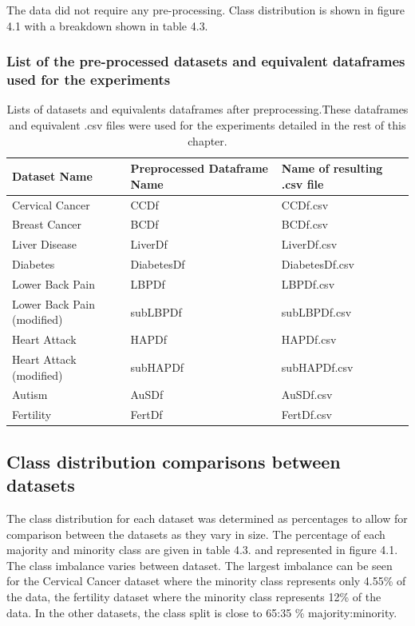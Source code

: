 The data did not require any pre-processing. Class distribution is shown in figure 4.1 with a breakdown shown in table 4.3.\newline


\subsubsection{List of the pre-processed datasets and equivalent dataframes used for the experiments}

\begin{table}[!htbp]
\centering
\begin{tabular}{p{3cm}p{3.5cm}p{3cm}}
  \hline
  \rowcolor{LightCyan}
Dataset Name & Preprocessed Dataframe Name & Name of resulting .csv file\\ 
  \hline
   Cervical Cancer & CCDf & CCDf.csv \\ 
   Breast Cancer & BCDf & BCDf.csv \\ 
   Liver Disease & LiverDf & LiverDf.csv \\ 
   Diabetes & DiabetesDf & DiabetesDf.csv \\ 
   Lower Back Pain & LBPDf &  LBPDf.csv\\ 
   Lower Back Pain (modified) & subLBPDf & subLBPDf.csv \\ 
   Heart Attack & HAPDf & HAPDf.csv \\ 
   Heart Attack (modified) & subHAPDf & subHAPDf.csv \\ 
   Autism & AuSDf & AuSDf.csv \\ 
   Fertility & FertDf & FertDf.csv \\ 
   \hline
\end{tabular}
\caption{Lists of datasets and equivalents dataframes after preprocessing.These dataframes and equivalent .csv files were used for the experiments detailed in the rest of this chapter.}
\label{tab:datasetsAndFrames}
\end{table}

\subsection{Class distribution comparisons between datasets}
The class distribution for each dataset was determined as percentages to allow for comparison between the datasets as they vary in size. 
The percentage of each majority and minority class are given in table 4.3. and represented in figure 4.1.
The class imbalance varies between dataset. The largest imbalance can be seen for the Cervical Cancer dataset where the minority class represents only 4.55\% of the data, the fertility dataset where the minority class represents 12\% of the data. In the other datasets, the class split is close to 65:35 \% majority:minority.

